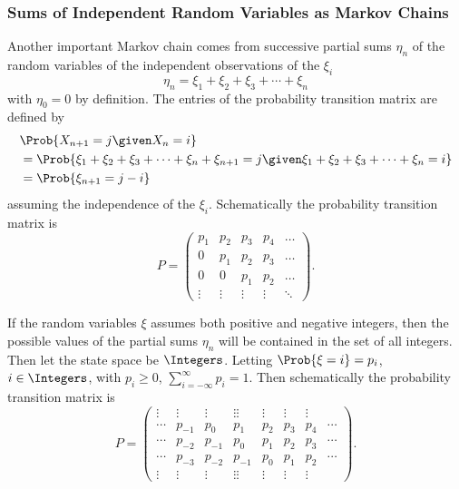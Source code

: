 \documentclass[12pt]{article}
\begin{document}
\subsubsection*{Sums of Independent Random Variables as Markov Chains}

Another important Markov chain comes from successive partial sums \(
\eta_n \) of the random variables of the independent observations of the
\( \xi_i \)
\[
    \eta_n = \xi_1 + \xi_2 + \xi_3 + \cdots + \xi_n
\] with \( \eta_0 = 0 \) by definition.%
The entries of the probability transition matrix are defined by
\begin{align*}
    &\Prob{X_{n+1} = j \given X_n = i} \\
    & = \Prob{\xi_1 + \xi_2 + \xi_3 + \cdots + \xi_n + \xi_{n+1} = j
    \given \xi_1 + \xi_2 + \xi_3 + \cdots + \xi_n = i} \\
    & = \Prob{\xi_{n+1} = j-i}
\end{align*}
assuming the independence of the \( \xi_i \).  Schematically the
probability transition matrix is
\[
    P =
    \begin{pmatrix}
        p_1 & p_2 & p_3 & p_4 & \dots \\
        0 & p_1 & p_2 & p_3 & \dots \\
        0 & 0 & p_1 & p_2 & \dots \\
        \vdots & \vdots & \vdots & \vdots & \ddots
    \end{pmatrix}
    .
\]

If the random variables \( \xi \) assumes both positive and negative
integers, then the possible values of the partial sums \( \eta_n \) will
be contained in the set of all integers.  Then let the state space be \(
\Integers \).  Letting \( \Prob{\xi = i} = p_{i} \), \( i \in \Integers \),
with \( p_i \ge 0 \), \( \sum_{i=-\infty}^{\infty} p_i = 1 \).  Then
schematically the probability transition matrix is
\[
    P =
    \begin{pmatrix}
        \vdots & \vdots & \vdots & \vdots \vdots & \vdots & \vdots &
        \vdots \\
        \cdots & p_{-1} & p_0 & p_1 & p_2 & p_3 & p_4 & \cdots \\
        \cdots & p_{-2} & p_{-1} & p_0 & p_1 & p_2 & p_3 & \cdots \\
        \cdots & p_{-3} & p_{-2} & p_{-1} & p_0 & p_1 & p_2 & \cdots \\
        \vdots & \vdots & \vdots & \vdots \vdots & \vdots & \vdots &
        \vdots
    \end{pmatrix}
    .
\]
\end{document}
